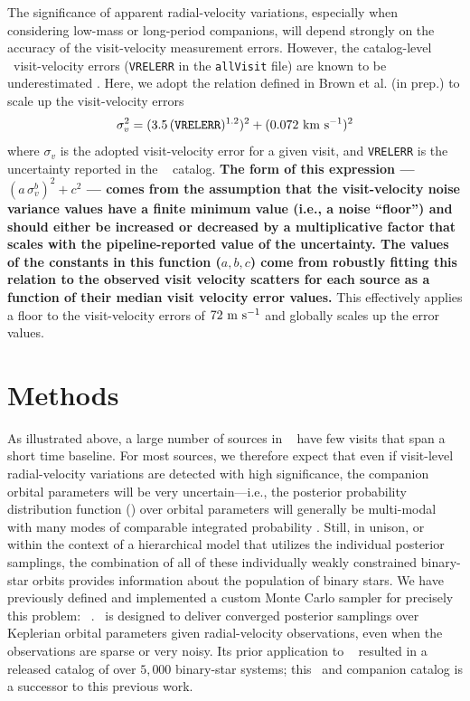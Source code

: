 \documentclass[modern]{aastex63}
\newcommand{\changes}[1]{{\bf\color{purple}#1}}
\begin{document}
The significance of apparent radial-velocity variations, especially when
considering low-mass or long-period companions, will depend strongly on the
accuracy of the visit-velocity measurement errors.
However, the catalog-level \apogee\ visit-velocity errors (\texttt{VRELERR} in
the \texttt{allVisit} file) are known to be underestimated
\citep[e.g.,][]{Cottaar:2014,Badenes:2018}.
Here, we adopt the relation defined in Brown et al. (in prep.) to scale up the
visit-velocity errors
\begin{equation}
    \sigma_v^2 = (3.5\,(\texttt{VRELERR})^{1.2})^2 + (0.072~\kms)^2 \label{eq:verr}
\end{equation}
where $\sigma_v$ is the adopted visit-velocity error for a given visit, and
\texttt{VRELERR} is the uncertainty reported in the \apogee\  catalog.
\changes{The form of this expression --- $(a\,\sigma_v^b)^2 + c^2$ --- comes
from the assumption that the visit-velocity noise variance values have a finite
minimum value (i.e., a noise ``floor'') and should either be increased or
decreased by a multiplicative factor that scales with the pipeline-reported
value of the uncertainty.
The values of the constants in this function ($a,b,c$) come from robustly
fitting this relation to the observed visit velocity scatters for each source as
a function of their median visit velocity error values.
}
This effectively applies a floor to the visit-velocity errors of $72~\mathrm{m}~\mathrm{s}^{-1}$ and
globally scales up the error values.


\section{Methods} \label{sec:methods}

As illustrated above, a large number of sources in \apogee\  have few
visits that span a short time baseline.
For most sources, we therefore expect that even if visit-level radial-velocity
variations are detected with high significance, the companion orbital parameters
will be very uncertain---i.e., the posterior probability distribution function
(\pdf) over orbital parameters will generally be multi-modal with many
modes of comparable integrated probability \citep[e.g.,][]{thejoker}.
Still, in unison, or within the context of a hierarchical model that utilizes
the individual posterior samplings, the combination of all of these individually
weakly constrained binary-star orbits provides information about the population
of binary stars.
We have previously defined and implemented a custom Monte Carlo sampler for
precisely this problem: \thejoker\ \citep{thejoker}.
\thejoker\ is designed to deliver converged posterior samplings over Keplerian
orbital parameters given radial-velocity observations, even when the
observations are sparse or very noisy.
Its prior application to \apogee\  \citep{Price-Whelan:2018} resulted in
a released catalog of over $5,000$ binary-star systems;
this \documentname\ and companion catalog is a successor to this previous work.
\end{document}

